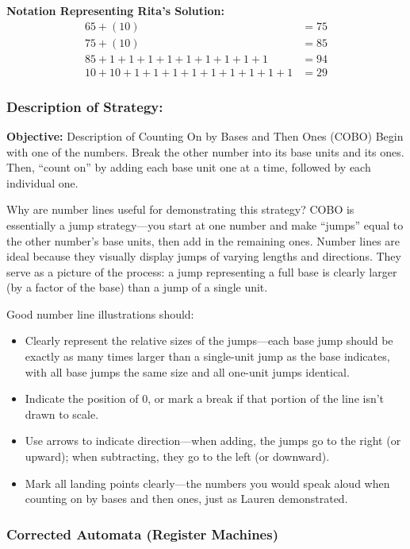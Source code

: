 \documentclass[11pt]{article}
\begin{document}
\noindent \textbf{Notation Representing Rita's Solution:}
\begin{align*}
    65 + (10) &= 75\\
    75 + (10) &= 85\\
    85 + 1 + 1 + 1 + 1 + 1 + 1 + 1 + 1 + 1 &= 94\\
    10 + 10 + 1 + 1 + 1 + 1 + 1 + 1 + 1 + 1 + 1 &= 29
    \end{align*}
    

\subsubsection*{Description of Strategy:}

 \textbf{Objective:} Description of Counting On by Bases and Then Ones (COBO)
 Begin with one of the numbers. Break the other number into its base units and its ones. Then, “count on” by adding each base unit one at a time, followed by each individual one.
 
 Why are number lines useful for demonstrating this strategy?
 COBO is essentially a jump strategy—you start at one number and make “jumps” equal to the other number’s base units, then add in the remaining ones. Number lines are ideal because they visually display jumps of varying lengths and directions. They serve as a picture of the process: a jump representing a full base is clearly larger (by a factor of the base) than a jump of a single unit.
 
 Good number line illustrations should:
\begin{itemize}
 \item Clearly represent the relative sizes of the jumps—each base jump should be exactly as many times larger than a single-unit jump as the base indicates, with all base jumps the same size and all one-unit jumps identical.
 \item Indicate the position of 0, or mark a break if that portion of the line isn’t drawn to scale.
 \item Use arrows to indicate direction—when adding, the jumps go to the right (or upward); when subtracting, they go to the left (or downward).
 \item Mark all landing points clearly—the numbers you would speak aloud when counting on by bases and then ones, just as Lauren demonstrated.
\end{itemize}

\subsubsection*{Corrected Automata (Register Machines)}
\end{document}
